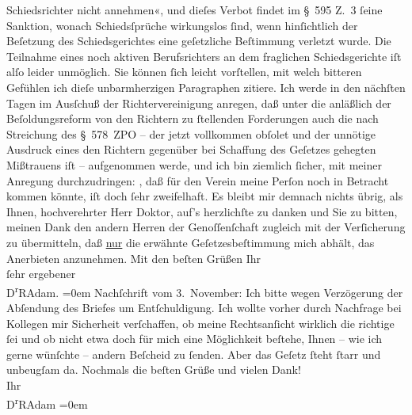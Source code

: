 \begin{ledgroupsized}[t]{13cm}
               Schiedsrichter nicht annehmen«, und dieſes Verbot findet im § 595 Z. 3 ſeine
               Sanktion, wonach Schiedsſprüche wirkungs{\pb}los ſind, wenn hinſichtlich der Beſetzung des Schiedsgerichtes eine geſetzliche
               Beſtimmung verletzt wurde. Die Teilnahme eines noch aktiven Berufsrichters an dem
               fraglichen Schiedsgerichte iſt alſo leider unmöglich.\pend
           \pstart
           Sie können ſich leicht vorſtellen, mit welch bitteren Gefühlen ich dieſe
               unbarmherzigen Paragraphen zitiere.\pend
           \pstart
           Ich werde in den nächſten Tagen im Ausſchuß der Richtervereinigung anregen, daß unter die anläßlich der Beſoldungsreform von
               den Richtern zu ſtellenden Forderungen auch die nach Streichung des § 578 ZPO – der
               jetzt vollkommen obſolet und der unnötige Ausdruck eines den Richtern gegenüber bei
               Schaffung des Geſetzes gehegten Mißtrauens iſt – aufgenommen werde, und ich bin
               ziemlich ſicher, mit meiner Anregung durchzudringen: \label{K_L02357-1v}\label{K_L02357-1h}, daß für den Verein meine Perſon noch in Betracht kommen
               könnte, iſt doch ſehr zweifelhaft.\pend
           \pstart
           {\pb}Es bleibt mir demnach nichts übrig, als
               Ihnen, hochverehrter Herr Doktor, auf’s herzlichſte zu danken und Sie zu bitten,
               meinen Dank den andern Herren der Genoſſenſchaft zugleich mit der Verſicherung zu übermitteln, daß \uline{nur} die erwähnte Geſetzesbeſtimmung mich abhält, das
               Anerbieten anzunehmen.\pend
           \pstart
           Mit den beſten Grüßen Ihr{\\[\baselineskip]}ſehr ergebener{\\[\baselineskip]}\spacefill\mbox{D\textsuperscript{r}RAdam.}\pend
           \leftskip=0em{}\pstart
           \noindent{}Nachſchrift vom 3. November:\pend
           \pstart
           Ich bitte wegen Verzögerung der Abſendung des Briefes um Entſchuldigung. Ich wollte
               vorher durch Nachfrage bei Kollegen mir Sicherheit verſchaffen, ob meine
               Rechtsanſicht wirklich die richtige ſei und ob nicht etwa doch für mich eine
               Möglichkeit beſtehe, Ihnen – wie ich gerne wünſchte – andern Beſcheid zu ſenden. Aber
                  {\pb}das Geſetz ſteht ſtarr und unbeugſam
               da.\pend
           \pstart
           Nochmals die beſten Grüße und vielen Dank!{\\[\baselineskip]}Ihr{\\[\baselineskip]}\spacefill\mbox{D\textsuperscript{r}RAdam}\pend
           \leftskip=0em{}
         

\end{ledgroupsized}
